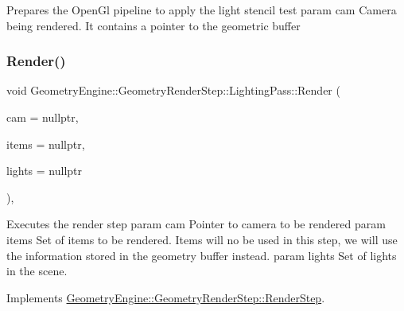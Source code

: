 Prepares the Open\+Gl pipeline to apply the light stencil test param cam Camera being rendered. It contains a pointer to the geometric buffer \mbox{\label{class_geometry_engine_1_1_geometry_render_step_1_1_lighting_pass_ae6d9fa99f67e659839ca310947787f52}} 
\subsubsection{\texorpdfstring{Render()}{Render()}}
{\footnotesize\ttfamily void Geometry\+Engine\+::\+Geometry\+Render\+Step\+::\+Lighting\+Pass\+::\+Render (\begin{DoxyParamCaption}\item[{\mbox{\hyperlink{class_geometry_engine_1_1_geometry_world_item_1_1_geometry_camera_1_1_camera}{Geometry\+World\+Item\+::\+Geometry\+Camera\+::\+Camera}} $\ast$}]{cam = {\ttfamily nullptr},  }\item[{std\+::unordered\+\_\+set$<$ \mbox{\hyperlink{class_geometry_engine_1_1_geometry_world_item_1_1_geometry_item_1_1_geometry_item}{Geometry\+World\+Item\+::\+Geometry\+Item\+::\+Geometry\+Item}} $\ast$ $>$ $\ast$}]{items = {\ttfamily nullptr},  }\item[{std\+::unordered\+\_\+set$<$ \mbox{\hyperlink{class_geometry_engine_1_1_geometry_world_item_1_1_geometry_light_1_1_light}{Geometry\+World\+Item\+::\+Geometry\+Light\+::\+Light}} $\ast$ $>$ $\ast$}]{lights = {\ttfamily nullptr} }\end{DoxyParamCaption})\hspace{0.3cm}{\ttfamily [override]}, {\ttfamily [virtual]}}

Executes the render step param cam Pointer to camera to be rendered param items Set of items to be rendered. Items will no be used in this step, we will use the information stored in the geometry buffer instead. param lights Set of lights in the scene. 

Implements \mbox{\hyperlink{class_geometry_engine_1_1_geometry_render_step_1_1_render_step_a9b054ee8f38304319a9d03ba3e173dcd}{Geometry\+Engine\+::\+Geometry\+Render\+Step\+::\+Render\+Step}}.

\mbox{\label{class_geometry_engine_1_1_geometry_render_step_1_1_lighting_pass_a437ff10a7ef9e7529a4852389a5cf871}} 
